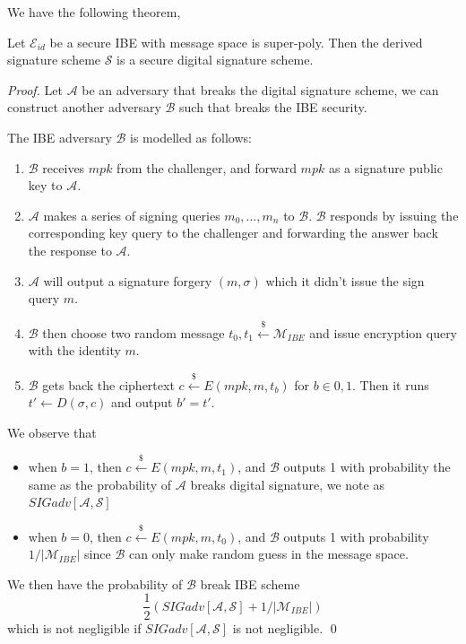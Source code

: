 We have the following theorem,
\begin{theorem}
    Let $\mathcal{E}_{id}$ be a secure IBE with message space is super-poly. Then the derived signature scheme $\mathcal{S}$ is a secure digital signature scheme. 
\end{theorem}
\begin{proof}
    Let $\mathcal{A}$ be an adversary that breaks the digital signature scheme, we can construct another adversary $\mathcal{B}$ such that breaks the IBE security.

    The IBE adversary $\mathcal{B}$ is modelled as follows:
    \begin{enumerate}
        \item $\mathcal{B}$ receives $mpk$ from the challenger, and forward $mpk$ as a signature public key to $\mathcal{A}$. 
        \item $\mathcal{A}$ makes a series of signing queries $m_0,\dots,m_n$ to $\mathcal{B}$. $\mathcal{B}$ responds by issuing the corresponding key query to the challenger and forwarding the answer back the response to $\mathcal{A}$. 
        \item $\mathcal{A}$ will output a signature forgery $(m,\sigma)$ which it didn't issue the sign query $m$. 
        \item $\mathcal{B}$ then choose two random message $t_0,t_1\stackrel{\$}{\gets}\mathcal{M}_{IBE}$ and issue encryption query with the identity $m$.
        \item $\mathcal{B}$ gets back the ciphertext $c\stackrel{\$}{\gets}E(mpk,m,t_b)$ for $b\in{0,1}$. Then it runs $t'\gets D(\sigma,c)$ and output $b'=t'$. 
    \end{enumerate}
    We observe that 
    \begin{itemize}
        \item when $b = 1$, then $c\stackrel{\$}{\gets}E(mpk, m,t_1)$, and $\mathcal{B}$ outputs 1 with probability the same as the probability of $\mathcal{A}$ breaks digital signature, we note as $SIGadv[\mathcal{A,S}]$
        \item when $b = 0$, then $c\stackrel{\$}{\gets}E(mpk, m,t_0)$, and $\mathcal{B}$ outputs 1 with probability $1/|\mathcal{M}_{IBE}|$ since $\mathcal{B}$ can only make random guess in the message space. 
    \end{itemize}
    We then have the probability of $\mathcal{B}$ break IBE scheme
    \[
        \frac{1}{2}(SIGadv[\mathcal{A,S}] + 1/|\mathcal{M}_{IBE}|)
    \]
    which is not negligible if $SIGadv[\mathcal{A,S}]$ is not negligible. \qed

\end{proof}

